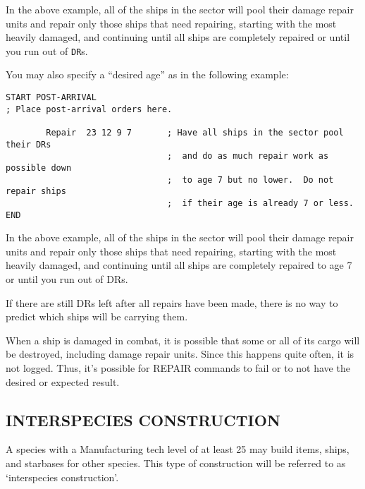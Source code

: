 \documentclass[10pt,titlepage]{article}
\begin{document}
In the above example, all of the ships in the sector will pool their damage
repair units and repair only those ships that need repairing, starting with the
most heavily damaged, and continuing until all ships are completely repaired or
until you run out of \texttt{DR}s.

You may also specify a ``desired age'' as in the following example:

\begin{verbatim}
START POST-ARRIVAL
; Place post-arrival orders here.

        Repair  23 12 9 7       ; Have all ships in the sector pool their DRs
                                ;  and do as much repair work as possible down
                                ;  to age 7 but no lower.  Do not repair ships
                                ;  if their age is already 7 or less.
END\end{verbatim} 


In the above example, all of the ships in the sector will pool their damage
repair units and repair only those ships that need repairing, starting with the
most heavily damaged, and continuing until all ships are completely repaired to
age 7 or until you run out of DRs.

If there are still DRs left after all repairs have been made, there is no way
to predict which ships will be carrying them.


\begin{importantnote}
	When a ship is damaged in combat, it is possible that some or
	all of its cargo will be destroyed, including damage repair
	units.  Since this happens quite often, it is not logged.  Thus,
	it's possible for REPAIR commands to fail or to not have the
	desired or expected result.
\end{importantnote}

\newpage
\subsection{INTERSPECIES CONSTRUCTION}

A species with a Manufacturing tech level of at least 25 may build items,
ships, and starbases for other species.  This type of construction will be
referred to as `interspecies construction'.
\end{document}
